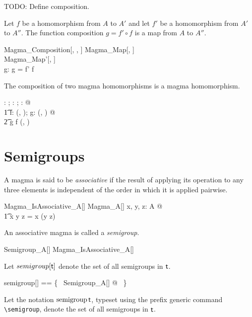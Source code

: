 \documentclass{amsart}
\begin{document}
TODO: Define composition.

Let $f$ be a homomorphism from $A$ to $A'$ and let $f'$ be a homomorphism from $A'$ to $A''$.
The function composition $g = f' \circ f$ is a map from $A$ to $A''$.

\begin{schema}{Magma\_Composition}[\genT, \genU, \genV]
	Magma\_Map[\genT, \genU] \\
	Magma\_Map'[\genU, \genV] \\
	g: \genT \pfun \genV
\where
	g = f' \circ f
\end{schema}

\begin{remark}
The composition of two magma homomorphisms is a magma homomorphism.
\begin{zed}
	\forall \strucA: \magma \setX; \strucB: \magma \setY; \strucC: \magma \setZ @ \\
	\t1	\forall f: \homMagma(\strucA, \strucB); g: \homMagma(\strucB, \strucC) @ \\
	\t2		g \circ f \in \homMagma(\strucA, \strucC)
\end{zed}
\end{remark}

\section{Semigroups}

A magma is said to be \textit{associative} if the result of applying its operation to any three elements
is independent of the order in which it is applied pairwise.

\begin{schema}{Magma\_IsAssociative\_A}[\genT]
	Magma\_A[\genT]
\where
	\forall x, y, z: A @ \\
	\t1	x \mulA y \mulA z = x \mulA (y \mulA z)
\end{schema}

An associative magma is called a \textit{semigroup}.
\begin{zed}
	Semigroup\_A[\genT]  Magma\_IsAssociative\_A[\genT]
\end{zed}

Let $semigroup[\mathsf{t}]$ denote the set of all semigroups in $\mathsf{t}$.

\begin{zed}
	semigroup[\genT] == \{~ Semigroup\_A[\genT] @ \strucA  ~\}
\end{zed}

Let the notation $\operatorname{semigroup} \mathsf{t}$, typeset using the prefix generic command \verb|\semigroup|,
denote the set of all semigroups in $\mathsf{t}$.
\end{document}
